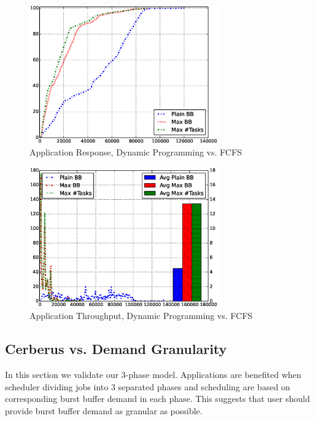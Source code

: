 \begin{figure}[!t]
\centering
\includegraphics[width=3.2in]{DrawDPvsFIFO/1000jobs_dp_vs_fifo_response}
\caption{Application Response, Dynamic Programming vs. FCFS}
\label{Fig:DPvsFIFOResponse}
\end{figure}


\begin{figure}[!t]
\centering
\includegraphics[width=3.2in]{DrawDPvsFIFO/1000jobs_dp_vs_fifo_throughput}
\caption{Application Throughput, Dynamic Programming vs. FCFS}
\label{Fig:DPvsFIFOThroughput}
\end{figure}


\subsection{Cerberus vs. Demand Granularity}
In this section we validate our 3-phase model.
Applications are benefited when scheduler dividing jobs into 3 separated phases and 
scheduling are based on corresponding burst buffer demand in each phase.
This suggests that user should provide burst buffer demand as granular as possible.


